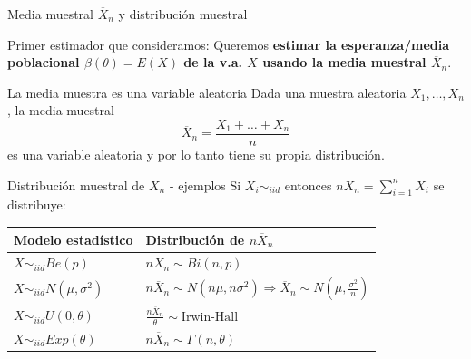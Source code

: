 \documentclass{beamer}
\theoremstyle{definition}
\begin{document}
\begin{frame}{\color{rosee}Media muestral  $\overline{X}_n$ y distribuci\'on muestral}
\small
  \begin{alertblock}{\color{rosee}Primer estimador que consideramos:}
      Queremos 
    \textbf{estimar la esperanza/media poblacional $\beta(\theta)=E(X)$ de la v.a. $X$ usando la media muestral $\overline{X}_n$}. 
  \end{alertblock}

  \begin{block}{La media muestra es una variable aleatoria}
    Dada una muestra aleatoria $X_{1},\dots,X_{n}$, la media muestral
    \begin{equation*}
      \overline{X}_{n}=\frac{X_{1}+\dots+X_{n}}{n}
    \end{equation*}
    es una variable aleatoria y por lo tanto tiene su propia
    distribuci\'on.
  \end{block}



\end{frame}

\begin{frame}{\color{rosee}Distribución muestral de $\overline{X}_n$ - ejemplos}\small
    Si $X_i\sim_{iid}$ entonces $n\overline{X}_n=\displaystyle\sum_{i=1}^{n}X_i$ se distribuye:
    \begin{table}[h!]
        \centering
        \begin{tabularx}{\linewidth}{|>{\hsize=0.6\hsize}X|>{\hsize=1.4\hsize}X|}
        \hline
        \textbf{Modelo estadístico}& \textbf{Distribución de} $n\overline{X}_n$\\
        \hline
        $X\sim_{iid}Be(p)$ & $n\overline{X}_n\sim Bi(n,p)$\\
        \hline
          $X\sim_{iid}N(\mu,\sigma^2)$ & $n\overline{X}_n\sim N(n\mu,n\sigma^2)\Rightarrow \overline{X}_n\sim N\left(\mu,\frac{\sigma^2}{n}\right)$\\
        \hline  
        $X\sim_{iid}U(0,\theta)$ & $\frac{n\overline{X}_n}{\theta} \sim \text{Irwin-Hall}$\\
        \hline
          $X\sim_{iid}Exp(\theta)$ & $n\overline{X}_n \sim \Gamma(n,\theta)$\\
        \hline
        \end{tabularx}
        \end{table}
\end{frame}

    
\end{document}
